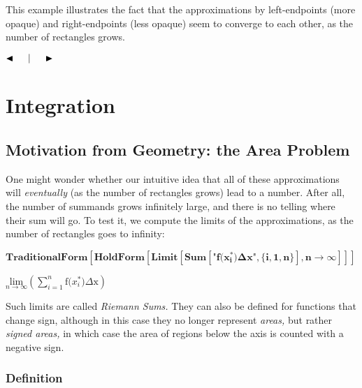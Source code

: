 \documentclass{article}
\begin{document}
\begin{doublespace}
\noindent\(\)
\end{doublespace}

This example illustrates the fact that the approximations by left-endpoints (more opaque) and right-endpoints (less opaque) seem to converge to each
other, as the number of rectangles grows. 

$\blacktriangleleft \thickspace \thickspace \thickspace $$\thickspace \thickspace |\thickspace \thickspace $$\thickspace \thickspace \thickspace
\blacktriangleright $



\section*{Integration}

\subsection*{Motivation from Geometry: the Area Problem}

One might wonder whether our intuitive idea that all of these approximations will \textit{ eventually} (as the number of rectangles grows) lead to
a number. After all, the number of summands grows infinitely large, and there is no telling where their sum will go. To test it, we compute the limits
of the approximations, as the number of rectangles goes to infinity: { } 

\begin{doublespace}
\noindent\(\pmb{\text{TraditionalForm}\left[\text{HoldForm}\left[\text{Limit}\left[\text{Sum}\left[\text{$\texttt{"}$f(}x_i^*\text{)$\Delta $x$\texttt{"}$},\{i,1,n\}\right],n\to
 \infty \right] \right]\right]}\)
\end{doublespace}

\begin{doublespace}
\noindent\(\underset{n\to \infty }{\text{lim}}\left(\sum _{i=1}^n \text{f(}x_i^*\text{)$\Delta $x}\right)\)
\end{doublespace}

Such limits are called \textit{ Riemann Sums. }They can also be defined for functions that change sign, although in this case they no longer represent
\textit{ areas, }but rather \textit{ signed areas, }in which case the area of regions below the axis is counted with a negative sign.

\subsubsection*{Definition}
\end{document}
